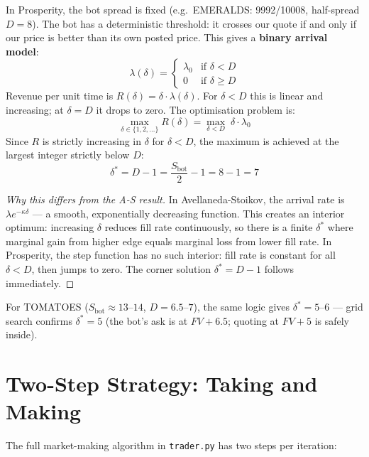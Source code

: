 \documentclass[12pt,a4paper,openany]{report}
\theoremstyle{definition}
\begin{document}
In Prosperity, the bot spread is fixed (e.g.\ EMERALDS: 9992/10008, half-spread $D = 8$). The bot has a deterministic threshold: it crosses our quote if and only if our price is better than its own posted price. This gives a \textbf{binary arrival model}:
\[
  \lambda(\delta) = \begin{cases} \lambda_0 & \text{if } \delta < D \\ 0 & \text{if } \delta \geq D \end{cases}
\]
Revenue per unit time is $R(\delta) = \delta \cdot \lambda(\delta)$. For $\delta < D$ this is linear and increasing; at $\delta = D$ it drops to zero. The optimisation problem is:
\[
  \max_{\delta \in \{1,2,\ldots\}} R(\delta) = \max_{\delta < D}\; \delta \cdot \lambda_0
\]
Since $R$ is strictly increasing in $\delta$ for $\delta < D$, the maximum is achieved at the largest integer strictly below $D$:
\[
  \delta^* = D - 1 = \frac{S_{\text{bot}}}{2} - 1 = 8 - 1 = 7
\]

\begin{proof}[Why this differs from the A-S result]
In Avellaneda-Stoikov, the arrival rate is $\lambda e^{-\kappa\delta}$ — a smooth, exponentially decreasing function. This creates an interior optimum: increasing $\delta$ reduces fill rate continuously, so there is a finite $\delta^*$ where marginal gain from higher edge equals marginal loss from lower fill rate. In Prosperity, the step function has no such interior: fill rate is constant for all $\delta < D$, then jumps to zero. The corner solution $\delta^* = D - 1$ follows immediately.
\end{proof}

For TOMATOES ($S_{\text{bot}} \approx 13$--$14$, $D = 6.5$--$7$), the same logic gives $\delta^* = 5$--$6$ — grid search confirms $\delta^* = 5$ (the bot's ask is at $FV + 6.5$; quoting at $FV + 5$ is safely inside).

\section{Two-Step Strategy: Taking and Making}

The full market-making algorithm in \texttt{trader.py} has two steps per iteration:
\end{document}
